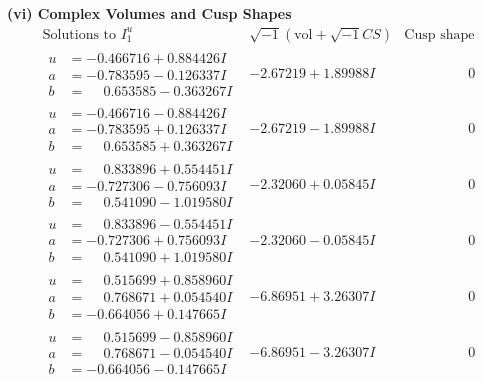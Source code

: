 \documentclass[1p]{elsarticle_modified}
\theoremstyle{definition}
\newcommand{\I}{\sqrt{-1}}
\begin{document}
\newpage\flushleft \textbf{(vi) Complex Volumes and Cusp Shapes}
$$\begin{array}{c|c|c}  
\text{Solutions to }I^u_{1}& \I (\text{vol} + \sqrt{-1}CS) & \text{Cusp shape}\\
 \hline 
\begin{aligned}
u &= -0.466716 + 0.884426 I \\
a &= -0.783595 - 0.126337 I \\
b &= \phantom{-}0.653585 - 0.363267 I\end{aligned}
 & -2.67219 + 1.89988 I & \phantom{-0.000000 } 0 \\ \hline\begin{aligned}
u &= -0.466716 - 0.884426 I \\
a &= -0.783595 + 0.126337 I \\
b &= \phantom{-}0.653585 + 0.363267 I\end{aligned}
 & -2.67219 - 1.89988 I & \phantom{-0.000000 } 0 \\ \hline\begin{aligned}
u &= \phantom{-}0.833896 + 0.554451 I \\
a &= -0.727306 - 0.756093 I \\
b &= \phantom{-}0.541090 - 1.019580 I\end{aligned}
 & -2.32060 + 0.05845 I & \phantom{-0.000000 } 0 \\ \hline\begin{aligned}
u &= \phantom{-}0.833896 - 0.554451 I \\
a &= -0.727306 + 0.756093 I \\
b &= \phantom{-}0.541090 + 1.019580 I\end{aligned}
 & -2.32060 - 0.05845 I & \phantom{-0.000000 } 0 \\ \hline\begin{aligned}
u &= \phantom{-}0.515699 + 0.858960 I \\
a &= \phantom{-}0.768671 + 0.054540 I \\
b &= -0.664056 + 0.147665 I\end{aligned}
 & -6.86951 + 3.26307 I & \phantom{-0.000000 } 0 \\ \hline\begin{aligned}
u &= \phantom{-}0.515699 - 0.858960 I \\
a &= \phantom{-}0.768671 - 0.054540 I \\
b &= -0.664056 - 0.147665 I\end{aligned}
 & -6.86951 - 3.26307 I & \phantom{-0.000000 } 0 \\ \hline\begin{aligned}

\end{aligned}
\end{array}$$
\end{document}

